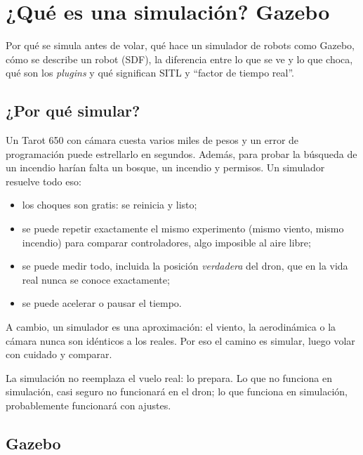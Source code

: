 \chapter{¿Qué es una simulación? Gazebo}
\label{cap:simulacion}

\begin{enpocas}
Por qué se simula antes de volar, qué hace un simulador de robots como Gazebo, cómo se describe un
robot (SDF), la diferencia entre lo que se ve y lo que choca, qué son los \emph{plugins} y qué
significan SITL y ``factor de tiempo real''.
\end{enpocas}

\section{¿Por qué simular?}

Un Tarot 650 con cámara cuesta varios miles de pesos y un error de programación puede estrellarlo en
segundos. Además, para probar la búsqueda de un incendio harían falta un bosque, un incendio y
permisos. Un simulador resuelve todo eso:
\begin{itemize}
  \item los choques son gratis: se reinicia y listo;
  \item se puede repetir exactamente el mismo experimento (mismo viento, mismo incendio) para comparar
        controladores, algo imposible al aire libre;
  \item se puede medir todo, incluida la posición \emph{verdadera} del dron, que en la vida real nunca
        se conoce exactamente;
  \item se puede acelerar o pausar el tiempo.
\end{itemize}
A cambio, un simulador es una aproximación: el viento, la aerodinámica o la cámara nunca son
idénticos a los reales. Por eso el camino es simular, luego volar con cuidado y comparar.

\begin{recuerda}
La simulación no reemplaza el vuelo real: lo prepara. Lo que no funciona en simulación, casi seguro
no funcionará en el dron; lo que funciona en simulación, probablemente funcionará con ajustes.
\end{recuerda}

\section{Gazebo}

